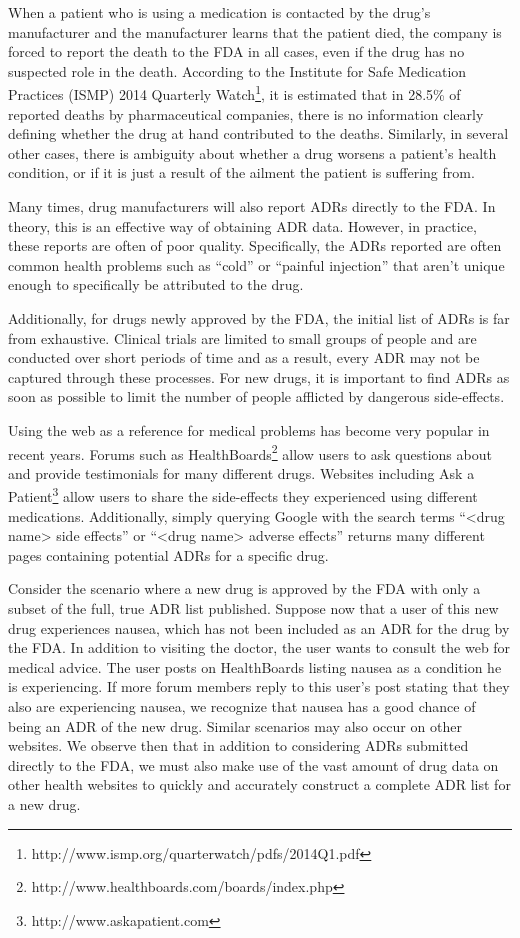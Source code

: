 \documentclass{acm_proc_article-sp}
\begin{document}
When a patient who is using a medication is contacted by the drug's manufacturer and the manufacturer learns that the patient died, the company is forced to report the death to the FDA in all cases, even if the drug has no suspected role in the death.  According to the Institute for Safe Medication Practices (ISMP) 2014 Quarterly Watch\footnote{http://www.ismp.org/quarterwatch/pdfs/2014Q1.pdf}, it is estimated that in 28.5\% of reported deaths by pharmaceutical companies, there is no information clearly defining whether the drug at hand contributed to the deaths. Similarly, in several other cases, there is ambiguity about whether a drug worsens a patient's health condition, or if it is just a result of the ailment the patient is suffering from. 

Many times, drug manufacturers will also report ADRs directly to the FDA. In theory, this is an effective way of obtaining ADR data. However, in practice, these reports are often of poor quality. Specifically, the ADRs reported are often common health problems such as ``cold'' or ``painful injection'' that aren't unique enough to specifically be attributed to the drug.

Additionally, for drugs newly approved by the FDA, the initial list of ADRs is far from exhaustive. Clinical trials are limited to small groups of people and are conducted over short periods of time and as a result, every ADR may not be captured through these processes. For new drugs, it is important to find ADRs as soon as possible to limit the number of people afflicted by dangerous side-effects.

Using the web as a reference for medical problems has become very popular in recent years. Forums such as HealthBoards\footnote{http://www.healthboards.com/boards/index.php} allow users to ask questions about and provide testimonials for many different drugs. Websites including Ask a Patient\footnote{http://www.askapatient.com} allow users to share the side-effects they experienced using different medications. Additionally, simply querying Google with the search terms ``<drug name> side effects'' or ``<drug name> adverse effects'' returns many different pages containing potential ADRs for a specific drug. 

Consider the scenario where a new drug is approved by the FDA with only a subset of the full, true ADR list published. Suppose now that a user of this new drug experiences nausea, which has not been included as an ADR for the drug by the FDA. In addition to visiting the doctor, the user wants to consult the web for medical advice. The user posts on HealthBoards listing nausea as a condition he is experiencing. If more forum members reply to this user's post stating that they also are experiencing nausea, we recognize that nausea has a good chance of being an ADR of the new drug. Similar scenarios may also occur on other websites. We observe then that in addition to considering ADRs submitted directly to the FDA, we must also make use of the vast amount of drug data on other health websites to quickly and accurately construct a complete ADR list for a new drug.
\end{document}
